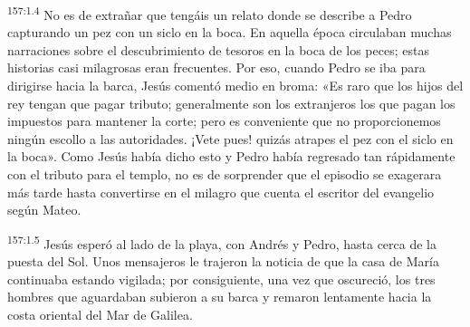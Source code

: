 \par 
\textsuperscript{157:1.4} No es de extrañar que tengáis un relato donde se describe a Pedro capturando un pez con un siclo en la boca. En aquella época circulaban muchas narraciones sobre el descubrimiento de tesoros en la boca de los peces; estas historias casi milagrosas eran frecuentes. Por eso, cuando Pedro se iba para dirigirse hacia la barca, Jesús comentó medio en broma: «Es raro que los hijos del rey tengan que pagar tributo; generalmente son los extranjeros los que pagan los impuestos para mantener la corte; pero es conveniente que no proporcionemos ningún escollo a las autoridades. ¡Vete pues! quizás atrapes el pez con el siclo en la boca». Como Jesús había dicho esto y Pedro había regresado tan rápidamente con el tributo para el templo, no es de sorprender que el episodio se exagerara más tarde hasta convertirse en el milagro que cuenta el escritor del evangelio según Mateo.

\par 
\textsuperscript{157:1.5} Jesús esperó al lado de la playa, con Andrés y Pedro, hasta cerca de la puesta del Sol. Unos mensajeros le trajeron la noticia de que la casa de María continuaba estando vigilada; por consiguiente, una vez que oscureció, los tres hombres que aguardaban subieron a su barca y remaron lentamente hacia la costa oriental del Mar de Galilea.

